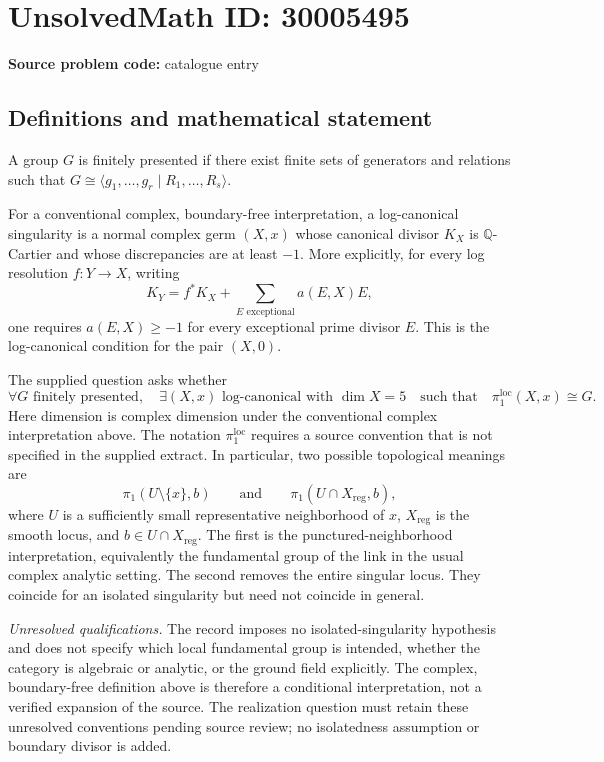 \documentclass[11pt]{article}
\newcommand{\Q}{\mathbb{Q}}
\begin{document}
\section*{UnsolvedMath ID: 30005495}
\textbf{Source problem code:} catalogue entry
\subsection{Definitions and mathematical statement}
A group \(G\) is finitely presented if there exist finite sets of generators and relations such that \(G\cong\langle g_1,\ldots,g_r\mid R_1,\ldots,R_s\rangle\).

For a conventional complex, boundary-free interpretation, a log-canonical singularity is a normal complex germ \((X,x)\) whose canonical divisor \(K_X\) is \(\Q\)-Cartier and whose discrepancies are at least \(-1\). More explicitly, for every log resolution \(f:Y\to X\), writing
\[
K_Y=f^*K_X+\sum_{E\text{ exceptional}}a(E,X)E,
\]
one requires \(a(E,X)\geq -1\) for every exceptional prime divisor \(E\). This is the log-canonical condition for the pair \((X,0)\).

The supplied question asks whether
\[
\forall G\text{ finitely presented},\quad
\exists (X,x)\text{ log-canonical with }\dim X=5
\quad\text{such that}\quad
\pi_1^{\mathrm{loc}}(X,x)\cong G.
\]
Here dimension is complex dimension under the conventional complex interpretation above. The notation \(\pi_1^{\mathrm{loc}}\) requires a source convention that is not specified in the supplied extract. In particular, two possible topological meanings are
\[
\pi_1(U\setminus\{x\},b)
\qquad\text{and}\qquad
\pi_1(U\cap X_{\mathrm{reg}},b),
\]
where \(U\) is a sufficiently small representative neighborhood of \(x\), \(X_{\mathrm{reg}}\) is the smooth locus, and \(b\in U\cap X_{\mathrm{reg}}\). The first is the punctured-neighborhood interpretation, equivalently the fundamental group of the link in the usual complex analytic setting. The second removes the entire singular locus. They coincide for an isolated singularity but need not coincide in general.

\emph{Unresolved qualifications.} The record imposes no isolated-singularity hypothesis and does not specify which local fundamental group is intended, whether the category is algebraic or analytic, or the ground field explicitly. The complex, boundary-free definition above is therefore a conditional interpretation, not a verified expansion of the source. The realization question must retain these unresolved conventions pending source review; no isolatedness assumption or boundary divisor is added.
\end{document}
